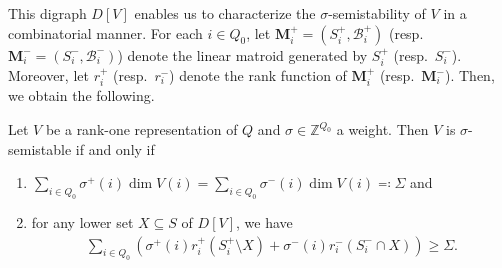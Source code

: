 \documentclass[a4paper,11pt]{article}
\numberwithin{equation}{section}
\newcommand{\Z}{\mathbb{Z}}
\newcommand{\M}{\mathbf{M}}
\begin{document}
This digraph $D[V]$ enables us to characterize the $\sigma$-semistability of $V$ in a combinatorial manner.
For each $i \in Q_0$,
let $\M_i^+ = (S_i^+, \mathcal{B}_i^+)$ (resp.\ $\M_i^- = (S_i^-, \mathcal{B}_i^-)$) denote the linear matroid generated by $S_i^+$ (resp.\ $S_i^-$).
Moreover, let $r_i^+$ (resp.\ $r_i^-$) denote the rank function of $\M_i^+$ (resp.\ $\M_i^-$).
Then, we obtain the following.
\begin{theorem}\label{thm:King:rank-one}
Let $V$ be a rank-one representation of $Q$ and $\sigma \in \Z^{Q_0}$ a weight.
Then $V$ is $\sigma$-semistable if and only if
\begin{enumerate}[{label={\upshape{(K\arabic*)}}}]
    \item $\sum_{i \in Q_0} \sigma^+(i) \dim V(i) = \sum_{i \in Q_0} \sigma^-(i) \dim V(i) \eqqcolon \Sigma$ and
    \item for any lower set $X \subseteq S$ of $D[V]$, we have
    \begin{align}
    \sum_{i \in Q_0}\left( \sigma^+(i) r_i^+(S_i^+ \setminus X) + \sigma^-(i) r_i^-(S_i^- \cap X) \right) \geq \Sigma.
\end{align}
\end{enumerate}
\end{theorem}
\end{document}
